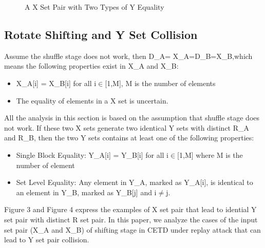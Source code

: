 \documentclass{article}
\begin{document}
\begin{figure}
\centering
{}
\caption{A X Set Pair with Two Types of Y Equality}
 \label{fig:y_both} %
\end{figure}

\subsection{Rotate Shifting and Y Set Collision} 
Assume the shuffle stage does not work, then D\_A= X\_A=D\_B=X\_B,which means the following properties exist in X\_A and X\_B:
\begin{itemize}
	\item X\_A[i] = X\_B[i] for all i$\in$[1,M], M is the number of elements
	\item The equality of elements in a X set is uncertain.
\end{itemize}
All the analysis in this section is based on the assumption that shuffle stage does not work.
If these two X sets generate two identical Y sets with distinct R\_A and R\_B, then the two Y sets contains  at least one of the following properties:
\begin{itemize}
	\item Single Block Equality: Y\_A[i] = Y\_B[i] for all i$\in$[1,M] where M is the number of element
	\item Set Level Equality: Any element in Y\_A, marked as Y\_A[i], is identical to an element in Y\_B, marked as Y\_B[j] and i$\neq$j.
\end{itemize}
Figure 3 and Figure 4 express the examples of X set pair that lead to idential Y set pair with distinct R set pair. In this paper, we analyze the cases of the input set pair (X\_A and X\_B) of shifting stage in CETD under replay attack that can lead to Y set pair collision.
\end{document}
